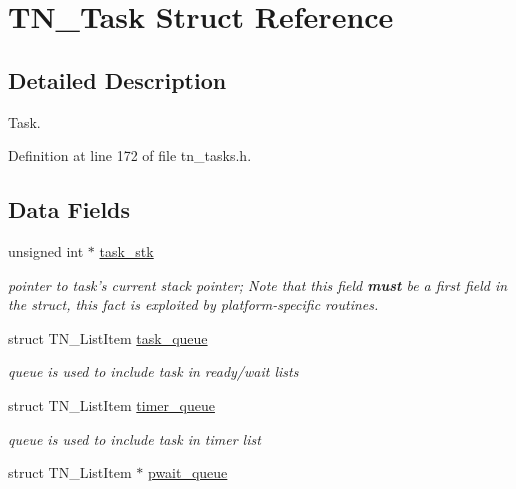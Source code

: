 \hypertarget{structTN__Task}{\section{T\+N\+\_\+\+Task Struct Reference}
\label{structTN__Task}
}


\subsection{Detailed Description}
Task. 

Definition at line 172 of file tn\+\_\+tasks.\+h.

\subsection*{Data Fields}
\begin{DoxyCompactItemize}
\item 
unsigned int $\ast$ \hyperlink{structTN__Task_a1cca1eb0979241a8b5a33d8c9f16bc59}{task\+\_\+stk}
\begin{DoxyCompactList}\small\item\em pointer to task's current stack pointer; Note that this field {\bfseries must} be a first field in the struct, this fact is exploited by platform-\/specific routines. \end{DoxyCompactList}\item 
\hypertarget{structTN__Task_a0772dfcd1f95d0ba10b9d2820fb9201b}{struct T\+N\+\_\+\+List\+Item \hyperlink{structTN__Task_a0772dfcd1f95d0ba10b9d2820fb9201b}{task\+\_\+queue}}\label{structTN__Task_a0772dfcd1f95d0ba10b9d2820fb9201b}

\begin{DoxyCompactList}\small\item\em queue is used to include task in ready/wait lists \end{DoxyCompactList}\item 
\hypertarget{structTN__Task_a4d45aa8770f1cf3237be8844e227f18b}{struct T\+N\+\_\+\+List\+Item \hyperlink{structTN__Task_a4d45aa8770f1cf3237be8844e227f18b}{timer\+\_\+queue}}\label{structTN__Task_a4d45aa8770f1cf3237be8844e227f18b}

\begin{DoxyCompactList}\small\item\em queue is used to include task in timer list \end{DoxyCompactList}\item 
\hypertarget{structTN__Task_a971ab5689af53bed2548c62f3bcabdc5}{struct T\+N\+\_\+\+List\+Item $\ast$ \hyperlink{structTN__Task_a971ab5689af53bed2548c62f3bcabdc5}{pwait\+\_\+queue}}\label{structTN__Task_a971ab5689af53bed2548c62f3bcabdc5}


\end{DoxyCompactItemize}

